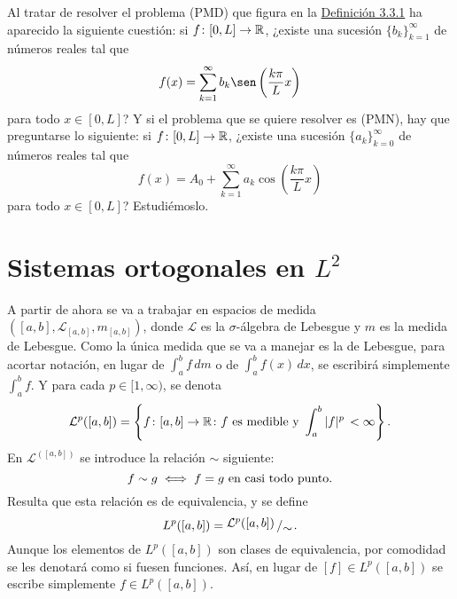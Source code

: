 \documentclass[a4paper, 12pt, extrafontsizes]{memoir}
\begin{document}
Al tratar de resolver el problema (PMD) que figura en la \hyperref[def:3.3.1]{\color{gray}Definición 3.3.1} ha aparecido la siguiente cuestión: si $f \colon [0,L] \to \mathbb R$, ¿existe una sucesión $\{b_k\}_{k=1}^\infty$ de números reales tal que
\[f(x)=\sum_{k=1}^\infty b_k\sen\left(\frac{k\pi}{L}x\right)\]
para todo $x \in [0,L]$? Y si el problema que se quiere resolver es (PMN), hay que preguntarse lo siguiente: si $f \colon [0,L] \to \mathbb R$, ¿existe una sucesión $\{a_k\}_{k=0}^\infty$ de números reales tal que
\[f(x)=A_0+\sum_{k=1}^\infty a_k\cos\left(\frac{k\pi}{L}x\right)\]
para todo $x \in [0,L]$? Estudiémoslo.

\section[Sistemas ortogonales en \texorpdfstring{$L^2$}{L2}]{Sistemas ortogonales en \texorpdfstring{\boldmath$L^2$}{L2}}

A partir de ahora se va a trabajar en espacios de medida $([a,b],\mathcal{L}_{[a,b]},m_{[a,b]})$, donde $\mathcal{L}$ es la $\sigma$-álgebra de Lebesgue y $m$ es la medida de Lebesgue. Como la única medida que se va a manejar es la de Lebesgue, para acortar notación, en lugar de $\int_a^b f \, d\!m$
o de $\int_a^b f(x) \, dx$, se escribirá simplemente $\int_a^b f$.
Y para cada $p \in [1,\infty)$, se denota
\[\mathcal{L}^p([a,b]) = \left\{f \colon [a,b] \to \mathbb R \colon f \textup{ es medible y } \int_a^b |f|^p \, < \infty\right\}.\]
En $\mathcal{L}^([a,b])$ se introduce la relación $\sim$ siguiente:
\[f \sim g \iff f = g \textup{ en casi todo punto}.\]
Resulta que esta relación es de equivalencia, y se define
\[L^p([a,b]) = \bigslant{\mathcal{L}^p([a,b])}{\sim}.\]
Aunque los elementos de $L^p([a,b])$ son clases de equivalencia, por comodidad se les denotará como si fuesen funciones. Así, en lugar de $[f] \in L^p([a,b])$ se escribe simplemente $f \in L^p([a,b])$. 
\end{document}

